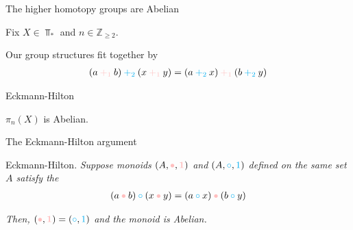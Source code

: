 \begin{frame}[t]{The higher homotopy groups are Abelian} %

  \par Fix $X \in \Top_{*}$ and $n \in \mathbb{Z}_{\geq 2}$.
  \par Our group structures fit together by
  \begin{align*}
    (a \mathbin{\textcolor{pink}{+_1}} b)
    \mathbin{\textcolor{cyan}{+_2}}
    (x \mathbin{\textcolor{pink}{+_1}} y)
    = (a \mathbin{\textcolor{cyan}{+_2}} x)
    \mathbin{\textcolor{pink}{+_1}}
    (b \mathbin{\textcolor{cyan}{+_2}} y)
  \end{align*}

  \vspace{2 \baselineskip}
  \par{} Eckmann-Hilton

  \vspace{8 \baselineskip}
  \par{} $\pi_n (X)$ is Abelian.
  
\end{frame}

\begin{frame}[t]{The Eckmann-Hilton argument}

  \par{} Eckmann-Hilton. \textit{Suppose monoids $(A, \textcolor{pink}{\bullet}, \textcolor{pink}{\mathbf{1}})$ and $(A, \textcolor{cyan}{\circ}, \textcolor{cyan}{1})$ defined on the same set $A$ satisfy the }
  \begin{align*}
    (a \mathbin{\textcolor{pink}{\bullet}} b)
    \mathbin{\textcolor{cyan}{\circ}}
    (x \mathbin{\textcolor{pink}{\bullet}} y)
    = (a \mathbin{\textcolor{cyan}{\circ}} x)
    \mathbin{\textcolor{pink}{\bullet}}
    (b \mathbin{\textcolor{cyan}{\circ}} y)
  \end{align*}
  \par \textit{Then, $(\textcolor{pink}{\bullet}, \textcolor{pink}{\mathbf{1}}) = (\textcolor{cyan}{\circ}, \textcolor{cyan}{1})$ and the monoid is Abelian.}
  \vspace{0.25 \baselineskip}
  \par{} 

\end{frame}
